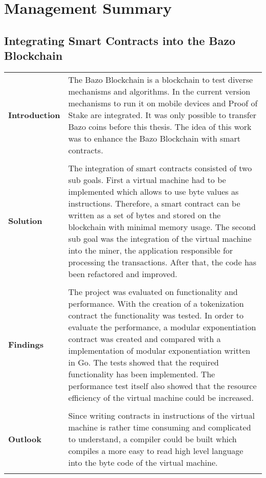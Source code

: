 \chapter*{Management Summary}
\thispagestyle{main} %

\section*{Integrating Smart Contracts into the Bazo Blockchain}

\begin{tabular}[t]{ p{3cm} p{12.5cm}}
\textbf{Introduction} & 
The Bazo Blockchain is a blockchain to test diverse mechanisms and algorithms. In the current version mechanisms to run it on mobile devices and Proof of Stake are integrated. It was only possible to transfer Bazo coins before this thesis. The idea of this work was to enhance the Bazo Blockchain with smart contracts. \\ \\

\raggedright
\textbf{Solution} & 
The integration of smart contracts consisted of two sub goals. First a virtual machine had to be implemented which allows to use byte values as instructions. Therefore, a smart contract can be written as a set of bytes and stored on the blockchain with minimal memory usage. The second sub goal was the integration of the virtual machine into the miner, the application responsible for processing the transactions. After that, the code has been refactored and improved. \\ \\

\raggedright
\textbf{Findings} & 
The project was evaluated on functionality and performance. With the creation of a tokenization contract the functionality was tested. In order to evaluate the performance, a modular exponentiation contract was created and compared with a implementation of modular exponentiation written in Go. The tests showed that the required functionality has been implemented. The performance test itself also showed that the resource efficiency of the virtual machine could be increased. \\ \\

\textbf{Outlook} &
Since writing contracts in instructions of the virtual machine is rather time consuming and complicated to understand, a compiler could be built which compiles a more easy to read high level language into the byte code of the virtual machine.
\\ \\
\end{tabular}
